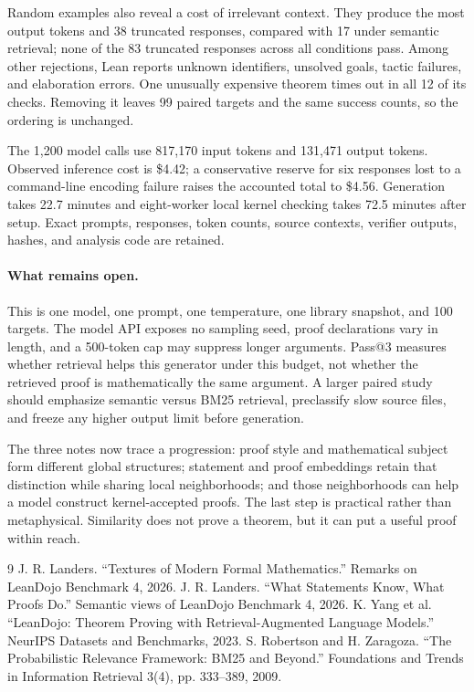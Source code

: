 \documentclass[11pt]{article}
\begin{document}
Random examples also reveal a cost of irrelevant context.  They produce the most output tokens and
38 truncated responses, compared with 17 under semantic retrieval; none of the 83 truncated
responses across all conditions pass.  Among other rejections, Lean reports unknown identifiers,
unsolved goals, tactic failures, and elaboration errors.  One unusually expensive theorem times out
in all 12 of its checks.  Removing it leaves 99 paired targets and the same success counts, so the
ordering is unchanged.

The 1,200 model calls use 817,170 input tokens and 131,471 output tokens.  Observed inference cost is
\$4.42; a conservative reserve for six responses lost to a command-line encoding failure raises the
accounted total to \$4.56.  Generation takes 22.7 minutes and eight-worker local kernel checking
takes 72.5 minutes after setup.  Exact prompts, responses, token counts, source contexts, verifier
outputs, hashes, and analysis code are retained.

\paragraph{What remains open.}
This is one model, one prompt, one temperature, one library snapshot, and 100 targets.  The model API
exposes no sampling seed, proof declarations vary in length, and a 500-token cap may suppress longer
arguments.  Pass@3 measures whether retrieval helps this generator under this budget, not whether
the retrieved proof is mathematically the same argument.  A larger paired study should emphasize
semantic versus BM25 retrieval, preclassify slow source files, and freeze any higher output limit
before generation.

The three notes now trace a progression: proof style and mathematical subject form different global
structures; statement and proof embeddings retain that distinction while sharing local
neighborhoods; and those neighborhoods can help a model construct kernel-accepted proofs.  The last
step is practical rather than metaphysical.  Similarity does not prove a theorem, but it can put a
useful proof within reach.

\begin{thebibliography}{9}\scriptsize
\setlength{\itemsep}{0pt}
 J. R. Landers. ``Textures of Modern Formal Mathematics.'' Remarks on LeanDojo Benchmark 4, 2026.
 J. R. Landers. ``What Statements Know, What Proofs Do.'' Semantic views of LeanDojo Benchmark 4, 2026.
 K. Yang et al. ``LeanDojo: Theorem Proving with Retrieval-Augmented Language Models.'' NeurIPS Datasets and Benchmarks, 2023.
 S. Robertson and H. Zaragoza. ``The Probabilistic Relevance Framework: BM25 and Beyond.'' Foundations and Trends in Information Retrieval 3(4), pp. 333--389, 2009.
\end{thebibliography}
\end{document}
